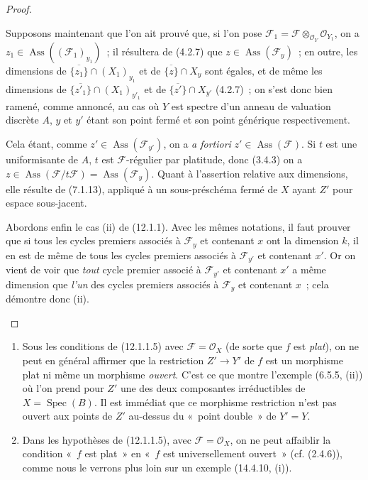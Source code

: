 \begin{proof}
\begin{env}[12.1.1.4]
Supposons maintenant que l'on ait prouvé que, si l'on pose
$\mathcal F_1=\mathcal F\otimes_{\mathcal O_Y}\mathcal O_{Y_1}$, on a
$z_1\in\operatorname{Ass}((\mathcal F_1)_{y_1})$~; il résultera de (4.2.7) que
$z\in\operatorname{Ass}(\mathcal F_y)$~; en outre, les dimensions de
$\overline{\{z_1\}}\cap(X_1)_{y_1}$ et de $\overline{\{z\}}\cap X_y$ sont
égales, et de même les dimensions de
$\overline{\{z'_1\}}\cap(X_1)_{y'_1}$ et de
$\overline{\{z'\}}\cap X_{y'}$ (4.2.7)~; on s'est donc bien ramené, comme
annoncé, au cas où $Y$ est spectre d'un anneau de valuation discrète $A$, $y$
et $y'$ étant son point fermé et son point générique respectivement.

Cela étant, comme $z'\in\operatorname{Ass}(\mathcal F_{y'})$, on a
\emph{a fortiori} $z'\in\operatorname{Ass}(\mathcal F)$. Si $t$ est une
uniformisante de $A$, $t$ est $\mathcal F$-régulier par platitude, donc (3.4.3)
on a $z\in\operatorname{Ass}(\mathcal F/t\mathcal F)
=\operatorname{Ass}(\mathcal F_y)$. Quant à l'assertion relative aux
dimensions, elle résulte de (7.1.13), appliqué à un sous-préschéma fermé de $X$
ayant $Z'$ pour espace sous-jacent.

Abordons enfin le cas (ii) de (12.1.1). Avec les mêmes notations, il faut
prouver que si tous les cycles premiers associés à $\mathcal F_y$ et contenant
$x$ ont la dimension $k$, il en est de même de tous les cycles premiers
associés à $\mathcal F_{y'}$ et contenant $x'$. Or on vient de voir que \emph{tout}
cycle premier associé à $\mathcal F_{y'}$ et contenant $x'$ a même dimension
que \emph{l'un} des cycles premiers associés à $\mathcal F_y$ et contenant $x$~; cela
démontre donc (ii).
\end{env}
\end{proof}

\begin{remarks}[12.1.2]
\begin{enumerate}[label=(\roman*)]
  \item Sous les conditions de (12.1.1.5) avec $\mathcal F=\mathcal O_X$ (de
  sorte que $f$ est \emph{plat}), on ne peut en général affirmer que la restriction
  $Z'\to Y'$ de $f$ est un morphisme plat ni même un morphisme \emph{ouvert}. C'est ce
  que montre l'exemple (6.5.5,
  (ii)) où l'on prend pour $Z'$ une des deux composantes irréductibles de
  $X=\operatorname{Spec}(B)$. Il est immédiat que ce morphisme restriction
  n'est pas ouvert aux points de $Z'$ au-dessus du «~point double~» de $Y'=Y$.
  \item Dans les hypothèses de (12.1.1.5), avec
  $\mathcal F=\mathcal O_X$, on ne peut affaiblir la condition «~$f$ est
  plat~» en «~$f$ est universellement ouvert~» (cf. (2.4.6)), comme nous le
  verrons plus loin sur un exemple (14.4.10, (i)).
\end{enumerate}
\end{remarks}

